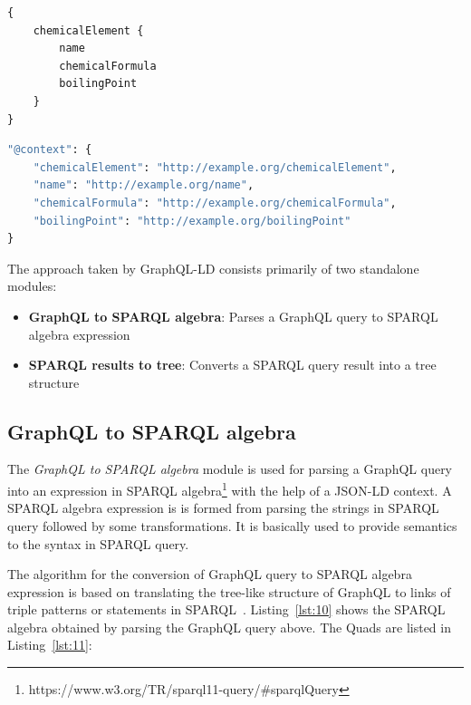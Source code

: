 \begin{minipage}{\linewidth}
\begin{lstlisting}[label=lst:8, caption={GraphQL query in GraphQL-LD to fetch chemical elements and their properties}, language=GraphQLException]
{
	chemicalElement {
		name
		chemicalFormula
		boilingPoint
	}
}
\end{lstlisting}
\end{minipage}

\begin{minipage}{\linewidth}
\begin{lstlisting}[label=lst:9, caption={JSON-LD context}, language=GraphQL]
"@context": {
	"chemicalElement": "http://example.org/chemicalElement",
	"name": "http://example.org/name",
	"chemicalFormula": "http://example.org/chemicalFormula",
	"boilingPoint": "http://example.org/boilingPoint"
}
\end{lstlisting}
\end{minipage}

The approach taken by GraphQL-LD consists primarily of two standalone modules:
\begin{itemize}
	\item \textbf{GraphQL to SPARQL algebra}: Parses a GraphQL query to SPARQL algebra expression
	\item \textbf{SPARQL results to tree}: Converts a SPARQL query result into a tree structure
\end{itemize}


\subsection{GraphQL to SPARQL algebra}

The \textit{GraphQL to SPARQL algebra} module is used for parsing a GraphQL query into an expression in SPARQL algebra\footnote{https://www.w3.org/TR/sparql11-query/\#sparqlQuery} with the help of a JSON-LD context. A SPARQL algebra expression is is formed from parsing the strings in SPARQL query followed by some transformations. It is basically used to provide semantics to the syntax in SPARQL query.

The algorithm for the conversion of GraphQL query to SPARQL algebra expression is based on translating the tree-like structure of GraphQL to links of triple patterns or statements  in SPARQL~\cite{Taelman2018}. Listing~\ref{lst:10} shows the SPARQL algebra obtained by parsing the GraphQL query above. The Quads are listed in Listing~\ref{lst:11}:

